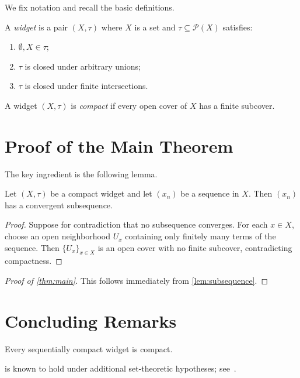 \documentclass[12pt]{amsart}
\begin{document}
We fix notation and recall the basic definitions.

\begin{definition}\label{def:widget}
  A \emph{widget} is a pair $(X, \tau)$ where $X$ is a set and
  $\tau \subseteq \mathcal{P}(X)$ satisfies:
  \begin{enumerate}
  \item
    $\emptyset, X \in \tau$;
  \item
    $\tau$ is closed under arbitrary unions;
  \item
    $\tau$ is closed under finite intersections.
  \end{enumerate}
\end{definition}

\begin{definition}\label{def:compact}
  A widget $(X, \tau)$ is \emph{compact} if every open cover of $X$ has a
  finite subcover.
\end{definition}


\section{Proof of the Main Theorem}\label{sec:proof}

The key ingredient is the following lemma.

\begin{lemma}\label{lem:subsequence}
  Let $(X, \tau)$ be a compact widget and let $(x_n)$ be a sequence in $X$.
  Then $(x_n)$ has a convergent subsequence.
\end{lemma}

\begin{proof}
  Suppose for contradiction that no subsequence converges.
  For each $x \in X$, choose an open neighborhood $U_x$ containing
  only finitely many terms of the sequence.
  Then $\{U_x\}_{x \in X}$ is an open cover with no finite subcover,
  contradicting compactness.
\end{proof}

\begin{proof}[Proof of \cref{thm:main}]
  This follows immediately from \cref{lem:subsequence}.
\end{proof}


\section{Concluding Remarks}\label{sec:remarks}

\begin{conjecture}\label{conj:converse}
  Every sequentially compact widget is compact.
\end{conjecture}

 is known to hold under additional set-theoretic
hypotheses;
see~\cite{example2024}.



\end{document}
